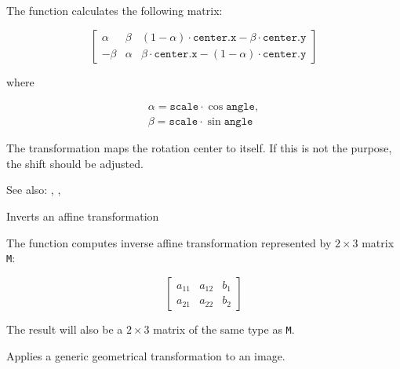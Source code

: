 The function calculates the following matrix:

\[
\begin{bmatrix}
\alpha & \beta & (1-\alpha) \cdot \texttt{center.x} - \beta \cdot \texttt{center.y} \\
-\beta & \alpha & \beta \cdot \texttt{center.x} - (1-\alpha) \cdot \texttt{center.y}
\end{bmatrix}
\]

where

\[
\begin{array}{l}
\alpha = \texttt{scale} \cdot \cos \texttt{angle},\\
\beta = \texttt{scale} \cdot \sin \texttt{angle}
\end{array}
\]

The transformation maps the rotation center to itself. If this is not the purpose, the shift should be adjusted.

See also: , , 


Inverts an affine transformation

\begin{description}
\end{description}

The function computes inverse affine transformation represented by $2 \times 3$ matrix \texttt{M}:

\[\begin{bmatrix}
a_{11} & a_{12} & b_1 \\
a_{21} & a_{22} & b_2
\end{bmatrix}
\]

The result will also be a $2 \times 3$ matrix of the same type as \texttt{M}.

Applies a generic geometrical transformation to an image.

